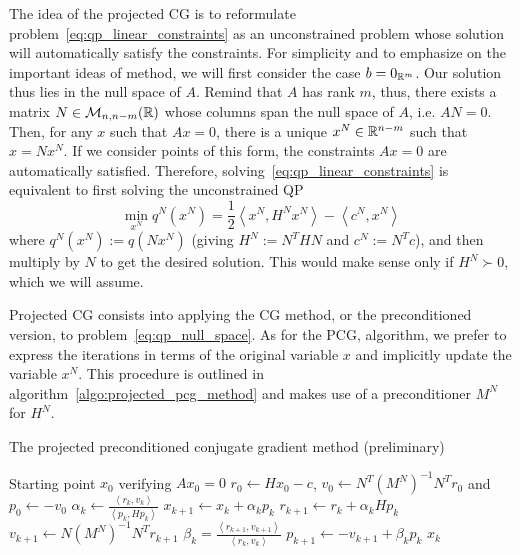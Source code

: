 \documentclass[10pt]{article}
\numberwithin{equation}{section}
\newcommand{\scal}[2]{\left\langle {#1} , {#2} \right\rangle} %
\begin{document}
	 The idea of the projected CG is to reformulate problem~\eqref{eq:qp_linear_constraints} as an unconstrained problem whose solution will automatically satisfy the constraints. For simplicity and to emphasize on the important ideas of method, we will first consider the case $b=0_{{\mathbb{R}}^m}$. Our solution thus lies in the null space of $A$. Remind that $A$ has rank $m$, thus, there exists a matrix $N\in {\mathcal{M}}_{n,n-m}({\mathbb{R}})$ whose columns span the null space of $A$, i.e. $AN=0$. Then, for any $x$ such that $Ax=0$, there is a unique $x^N \in {\mathbb{R}}^{n-m}$ such that $x = Nx^N$. If we consider points of this form, the constraints $Ax=0$ are automatically satisfied. Therefore, solving~\eqref{eq:qp_linear_constraints} is equivalent to first solving the unconstrained QP
	  \begin{equation}\label{eq:qp_null_space}
	 		\min_{x^N} q^N(x^N) = \dfrac{1}{2} \scal{x^N}{H^Nx^N} - \scal{c^N}{x^N}
	 \end{equation}
	 where $q^N(x^N) := q(Nx^N)$ (giving $H^N:=N^THN$ and $c^N:=N^Tc$), and then multiply by $N$ to get the desired solution. This would make sense only if $H^N \succ 0$, which we will assume.
	 
	 Projected CG consists into applying the CG method, or the preconditioned version, to problem~\eqref{eq:qp_null_space}.	As for the PCG, algorithm, we prefer to express the iterations in terms of the original variable $x$ and implicitly update the variable $x^N$. This procedure is outlined in algorithm~\ref{algo:projected_pcg_method} and makes use of a preconditioner $M^N$ for $H^N$.
	 
	 \begin{algorithm}
	 	\caption{The projected preconditioned conjugate gradient method (preliminary)}\label{algo:preliminary_projected_pcg_method}
	 	\begin{algorithmic}
	 		\Require Starting point $x_0$ verifying $Ax_0=0$
	 		\State $r_0 \gets Hx_0-c$, $v_0\gets N^T(M^N)^{-1}N^Tr_0$ and $p_0 \gets -v_0$
	 		\State $\alpha_k \gets \frac{\scal{r_k}{v_k}}{\scal{p_k}{Hp_k}}$
	 			\State $x_{k+1} \gets x_k+\alpha_kp_k$
	 			\State $r_{k+1} \gets r_k + \alpha_kHp_k$
	 			\State $v_{k+1}\gets N{(M^N)}^{-1}N^Tr_{k+1}$
	 			\State $\beta_k =  \frac{\scal{r_{k+1}}{v_{k+1}}}{\scal{r_k}{v_k}}$
	 			\State $p_{k+1} \gets -v_{k+1}+\beta_kp_k$
	 			\EndFor{}
	 			\Return $x_k$
	 		\end{algorithmic}
	 	\end{algorithm} 
	 
\end{document}
